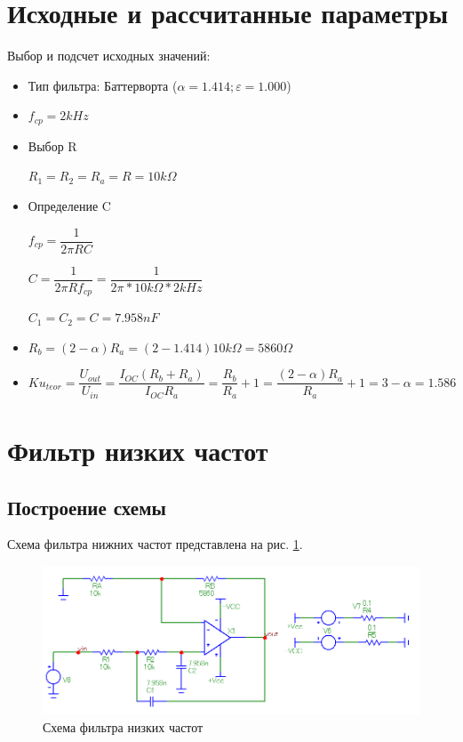 \documentclass[a4paper,14pt]{article}
\begin{document}

\pagebreak
\section{Исходные и рассчитанные параметры}

Выбор и подсчет исходных значений:
\begin{itemize}

\item Тип фильтра: Баттерворта ($\alpha = 1.414; \varepsilon = 1.000$)

\item $f_{cp} = 2kHz$

\item Выбор R

$R_1 = R_2 = R_a = R = 10 k\Omega$

\item Определение C

$f_{cp} = \dfrac{1}{2\pi RC}$

$C = \dfrac{1}{2\pi Rf_{cp}} = \dfrac{1}{2\pi * 10k\Omega * 2kHz}$

$C_1 = C_2 = C = 7.958 nF$

\item $R_b = (2-\alpha)R_a = (2 - 1.414)10k\Omega = 5860 \Omega$

\item $Ku_{teor} = \dfrac{U_{out}}{U_{in}} = \dfrac{I_{OC}(R_b + R_a)}{I_{OC}R_a} = \dfrac{R_b}{R_a} + 1 = \dfrac{(2 - \alpha) R_a}{R_a} + 1 = 3 - \alpha = 1.586$
\end{itemize}

\section{Фильтр низких частот}

\subsection{Построение схемы}

Схема фильтра нижних частот представлена на рис. \ref{fig:shfnch}.

\begin{figure}[H]
	\centering
	\includegraphics[width=0.85\linewidth]{../imgs/FNCH/sh_fnch}
	\caption{Схема фильтра низких частот}
	\label{fig:shfnch}
\end{figure}
\end{document}
